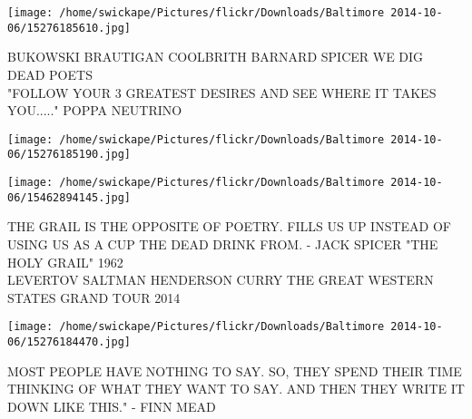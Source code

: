 \documentclass[10pt,letterpaper]{article}
\begin{document}
\vspace{0.25in}
\texttt{[image: /home/swickape/Pictures/flickr/Downloads/Baltimore 2014-10-06/15276185610.jpg]}

BUKOWSKI BRAUTIGAN COOLBRITH BARNARD SPICER WE DIG DEAD POETS\\
"FOLLOW YOUR 3 GREATEST DESIRES AND SEE WHERE IT TAKES YOU....." POPPA NEUTRINO\\
\pagebreak

\texttt{[image: /home/swickape/Pictures/flickr/Downloads/Baltimore 2014-10-06/15276185190.jpg]}

\vspace{0.25in}
\texttt{[image: /home/swickape/Pictures/flickr/Downloads/Baltimore 2014-10-06/15462894145.jpg]}

THE GRAIL IS THE OPPOSITE OF POETRY.  FILLS US UP INSTEAD OF USING US AS A CUP THE DEAD DRINK FROM.  {-} JACK SPICER "THE HOLY GRAIL" 1962\\
LEVERTOV SALTMAN HENDERSON CURRY THE GREAT WESTERN STATES GRAND TOUR 2014\\
\pagebreak

\texttt{[image: /home/swickape/Pictures/flickr/Downloads/Baltimore 2014-10-06/15276184470.jpg]}

MOST PEOPLE HAVE NOTHING TO SAY.  SO, THEY SPEND THEIR TIME THINKING OF WHAT THEY WANT TO SAY.  AND THEN THEY WRITE IT DOWN LIKE THIS." {-} FINN MEAD\\
\pagebreak
\end{document}
